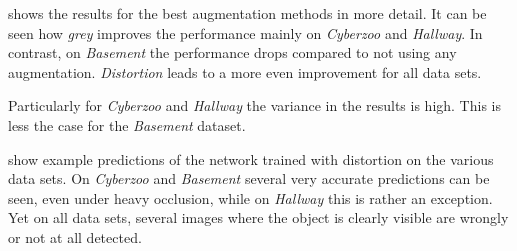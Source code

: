  shows the results for the best augmentation methods in more detail. It can be seen how \textit{grey} improves the performance mainly on \textit{Cyberzoo} and \textit{Hallway}. In contrast, on \textit{Basement} the performance drops compared to not using any augmentation. \textit{Distortion} leads to a more even improvement for all data sets.

Particularly for \textit{Cyberzoo} and \textit{Hallway} the variance in the results is high. This is less the case for the \textit{Basement} dataset.

 show example predictions of the network trained with distortion on the various data sets. On \textit{Cyberzoo} and \textit{Basement} several very accurate predictions can be seen, even under heavy occlusion, while on \textit{Hallway} this is rather an exception. Yet on all data sets, several images where the object is clearly visible are wrongly or not at all detected.

